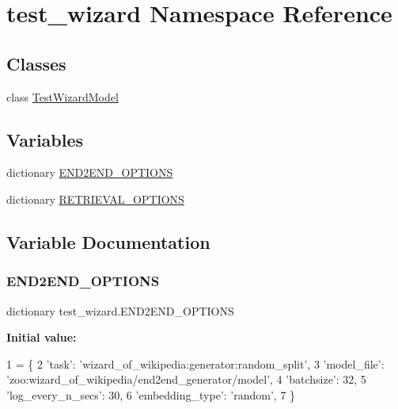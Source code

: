 \hypertarget{namespacetest__wizard}{}\section{test\+\_\+wizard Namespace Reference}
\label{namespacetest__wizard}
\subsection*{Classes}
\begin{DoxyCompactItemize}
\item 
class \hyperlink{classtest__wizard_1_1TestWizardModel}{Test\+Wizard\+Model}
\end{DoxyCompactItemize}
\subsection*{Variables}
\begin{DoxyCompactItemize}
\item 
dictionary \hyperlink{namespacetest__wizard_af6ffdbd4dab5e08b88ed0eda2622b06b}{E\+N\+D2\+E\+N\+D\+\_\+\+O\+P\+T\+I\+O\+NS}
\item 
dictionary \hyperlink{namespacetest__wizard_a007066f16642cc2aa5f021c2d4b2e794}{R\+E\+T\+R\+I\+E\+V\+A\+L\+\_\+\+O\+P\+T\+I\+O\+NS}
\end{DoxyCompactItemize}


\subsection{Variable Documentation}
\mbox{\label{namespacetest__wizard_af6ffdbd4dab5e08b88ed0eda2622b06b}} 
\subsubsection{\texorpdfstring{E\+N\+D2\+E\+N\+D\+\_\+\+O\+P\+T\+I\+O\+NS}{END2END\_OPTIONS}}
{\footnotesize\ttfamily dictionary test\+\_\+wizard.\+E\+N\+D2\+E\+N\+D\+\_\+\+O\+P\+T\+I\+O\+NS}

{\bfseries Initial value\+:}
\begin{DoxyCode}
1 =  \{
2     \textcolor{stringliteral}{'task'}: \textcolor{stringliteral}{'wizard\_of\_wikipedia:generator:random\_split'},
3     \textcolor{stringliteral}{'model\_file'}: \textcolor{stringliteral}{'zoo:wizard\_of\_wikipedia/end2end\_generator/model'},
4     \textcolor{stringliteral}{'batchsize'}: 32,
5     \textcolor{stringliteral}{'log\_every\_n\_secs'}: 30,
6     \textcolor{stringliteral}{'embedding\_type'}: \textcolor{stringliteral}{'random'},
7 \}
\end{DoxyCode}


